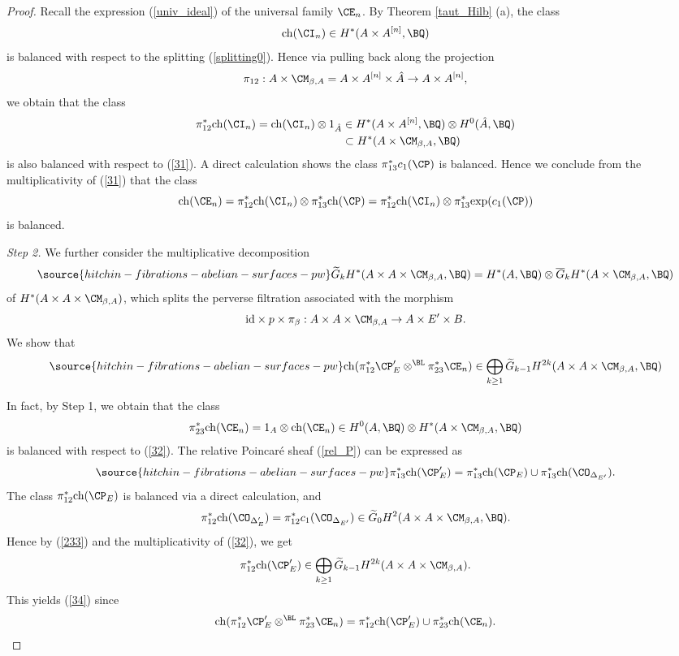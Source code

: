 \begin{proof}
Recall the expression (\ref{univ_ideal}) of the universal family $\CE_n$. By Theorem \ref{taut_Hilb} (a), the class
\[
\mathrm{ch}(\CI_n) \in  H^{\ast}(A\times A^{[n]}, \BQ)
\]
is balanced with respect to the splitting (\ref{splitting0}). Hence via pulling back along the projection
\[
\pi_{12}: A\times \CM_{\beta,A} = A\times A^{[n]} \times \hat{A} \to A \times A^{[n]},
\]
we obtain that the class
\[
\begin{split}
\pi_{12}^\ast \mathrm{ch}(\CI_n) =  \mathrm{ch}(\CI_n) \otimes 1_{\hat{A}} & \in H^\ast(A \times A^{[n]}, \BQ) \otimes H^0(\hat{A}, \BQ)\\  & \subset H^*(A\times \CM_{\beta,A}, \BQ)
\end{split}
\]
is also balanced with respect to (\ref{31}). A direct calculation shows the class $\pi_{13}^\ast c_1(\CP)$ is balanced. Hence we conclude from the multiplicativity of (\ref{31}) that the class
\[
\mathrm{ch}(\CE_n) = \pi_{12}^\ast \mathrm{ch}(\CI_n) \otimes \pi_{13}^\ast \mathrm{ch}(\CP)=  \pi_{12}^\ast \mathrm{ch}(\CI_n) \otimes \pi_{13}^\ast \mathrm{exp}(c_1(\CP))
\]
is balanced.


 \emph{Step 2.} We further consider the multiplicative decomposition
\begin{equation}\label{32}
\source{hitchin-fibrations-abelian-surfaces-pw}
\widetilde{G}_k H^*(A \times A \times \CM_{\beta, A}, \BQ) = H^*(A, \BQ) \otimes \overline{G}_k H^*(A \times \CM_{\beta, A}, \BQ)
\end{equation}
of $H^*(A \times A \times \CM_{\beta, A})$, which splits the perverse filtration associated with the morphism
\[
\mathrm{id} \times p \times \pi_\beta: A \times A \times \CM_{\beta, A} \to A \times E'\times B.
\]
We show that
\begin{equation}\label{34}
\source{hitchin-fibrations-abelian-surfaces-pw}
\mathrm{ch}(\pi_{12}^\ast {\CP'_{E}} \otimes^{\BL} \pi_{23}^\ast \CE_n) \in \bigoplus_{k\geq 1}\widetilde{G}_{k-1} H^{2k}(A \times A\times \CM_{\beta, A}, \BQ)
\end{equation}

In fact, by Step 1, we obtain that the class
\[
\pi_{23}^* \mathrm{ch}(\CE_n) = 1_A \otimes \mathrm{ch}(\CE_n) \in H^0(A, \BQ) \otimes H^*(A\times \CM_{\beta,A}, \BQ)
\]
is balanced with respect to (\ref{32}). The relative Poincar\'e sheaf (\ref{rel_P}) can be expressed as
\begin{equation}\label{233}
\source{hitchin-fibrations-abelian-surfaces-pw}
\pi_{13}^\ast \mathrm{ch}(\CP'_E) = \pi_{13}^\ast \mathrm{ch}(\CP_E)\cup \pi_{13}^* \mathrm{ch}(\CO_{\Delta_{E'}}).
\end{equation}
The class $\pi_{12}^\ast \mathrm{ch}(\CP_E)$ is balanced via a direct calculation, and
\[
\pi_{12}^*\mathrm{ch}(\CO_{\Delta_E'}) = \pi_{12}^* c_1(\CO_{\Delta_{E'}}) \in \widetilde{G}_0 H^2(A\times A \times \CM_{\beta,A}, \BQ).
\]
Hence by (\ref{233}) and the multiplicativity of (\ref{32}), we get
\[
\pi_{12}^* \mathrm{ch}(\CP'_E)\in \bigoplus_{k\geq 1} \widetilde{G}_{k-1}H^{2k}(A\times A \times \CM_{\beta,A}).
\]
This yields (\ref{34}) since
\[
\mathrm{ch}(\pi_{12}^\ast {\CP'_{E}} \otimes^{\BL} \pi_{23}^\ast \CE_n) = \pi_{12}^*\mathrm{ch}(\CP'_E) \cup \pi_{23}^\ast \mathrm{ch}(\CE_n).
\]


\end{proof}

